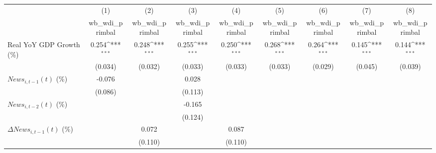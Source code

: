{
\def\sym#1{\ifmmode^{#1}\else\(^{#1}\)\fi}
\begin{tabular}{l*{8}{c}}
\toprule
                    &\multicolumn{1}{c}{(1)}&\multicolumn{1}{c}{(2)}&\multicolumn{1}{c}{(3)}&\multicolumn{1}{c}{(4)}&\multicolumn{1}{c}{(5)}&\multicolumn{1}{c}{(6)}&\multicolumn{1}{c}{(7)}&\multicolumn{1}{c}{(8)}\\
                    &\multicolumn{1}{c}{wb_wdi_primbal}&\multicolumn{1}{c}{wb_wdi_primbal}&\multicolumn{1}{c}{wb_wdi_primbal}&\multicolumn{1}{c}{wb_wdi_primbal}&\multicolumn{1}{c}{wb_wdi_primbal}&\multicolumn{1}{c}{wb_wdi_primbal}&\multicolumn{1}{c}{wb_wdi_primbal}&\multicolumn{1}{c}{wb_wdi_primbal}\\
\midrule
Real YoY GDP Growth (\%)&       0.254\sym{***}&       0.248\sym{***}&       0.255\sym{***}&       0.250\sym{***}&       0.268\sym{***}&       0.264\sym{***}&       0.145\sym{***}&       0.144\sym{***}\\
                    &     (0.034)         &     (0.032)         &     (0.033)         &     (0.033)         &     (0.033)         &     (0.029)         &     (0.045)         &     (0.039)         \\
\addlinespace
$ News_{i,t-1}(t)$ (\%)&      -0.076         &                     &       0.028         &                     &                     &                     &                     &                     \\
                    &     (0.086)         &                     &     (0.113)         &                     &                     &                     &                     &                     \\
\addlinespace
$ News_{i,t-2}(t)$ (\%)&                     &                     &      -0.165         &                     &                     &                     &                     &                     \\
                    &                     &                     &     (0.124)         &                     &                     &                     &                     &                     \\
\addlinespace
$ \Delta News_{i,t-1}(t)$ (\%)&                     &       0.072         &                     &       0.087         &                     &                     &                     &                     \\
                    &                     &     (0.110)         &                     &     (0.110)         &                     &                     &                     &                     \\

\end{tabular}}
